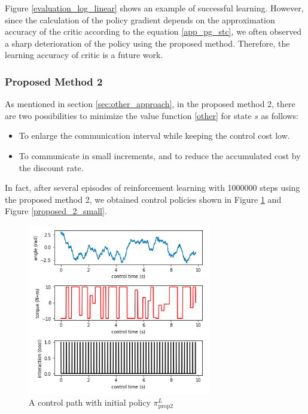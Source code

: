 \documentclass[english, dvipdfmx]{ampmt}             %
\begin{document}
Figure \ref{evaluation_log_linear} shows an example of successful learning. However, since the calculation of the policy gradient depends on the approximation accuracy of the critic according to the equation \eqref{app_pg_stc}, we often observed a sharp deterioration of the policy using the proposed method. Therefore, the learning accuracy of critic is a future work.

\subsubsection{Proposed Method 2}
As mentioned in section \ref{sec:other_approach}, in the proposed method 2, there are two possibilities to minimize the value function \eqref{other} for state $s$ as follows:
\begin{itemize}
	\item To enlarge the communication interval while keeping the control cost low.
	\item To communicate in small increments, and to reduce the accumulated cost by the discount rate.
\end{itemize}
In fact, after several episodes of reinforcement learning with 1000000 steps using the proposed method 2, we obtained control policies shown in Figure \ref{proposed_2_large} and Figure \ref{proposed_2_small}. 
\begin{figure}[h]%
	\centering
 	\includegraphics[width=8cm]{sample_02.png}
 	\caption{A control path with initial policy $\pi_{\textrm{prop}2}^L$} \label{proposed_2_large}
\end{figure}\\
\end{document}
